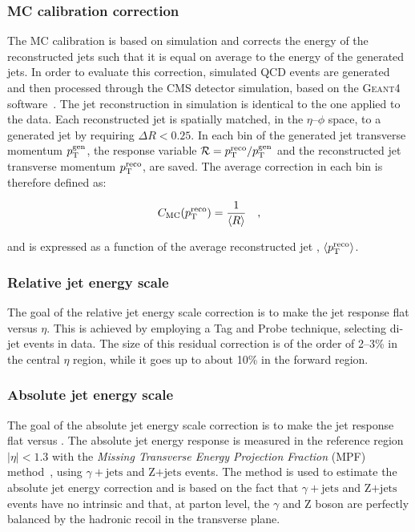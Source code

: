 \subsubsection{MC calibration correction}

The MC calibration is based on simulation and corrects the energy of the reconstructed jets such that it is equal on average to the energy of the generated jets. In order to evaluate this correction, simulated QCD events are generated and then processed through the CMS detector simulation, based on the \textsc{Geant4} software~\cite{Agostinelli:2002hh}. The jet reconstruction in simulation is identical to the one applied to the data. Each reconstructed jet is spatially matched, in the $\eta$--$\phi$ space, to a generated jet by requiring $\Delta R < 0.25$. In each bin of the generated jet transverse momentum $p_\mathrm{T}^\mathrm{gen}$, the response variable $\mathcal{R}=p_\mathrm{T}^\mathrm{reco}/p_\mathrm{T}^\mathrm{gen}$ and the reconstructed jet transverse momentum $p_\mathrm{T}^\mathrm{reco}$, are saved. The average correction in each bin is therefore defined as:

\begin{equation}
C_\mathrm{MC}(p_\mathrm{T}^\mathrm{reco}) = \frac{1}{\langle R \rangle} \quad,
\end{equation}

\noindent and is expressed as a function of the average reconstructed jet \pt, $\langle p_\mathrm{T}^\mathrm{reco} \rangle$.

\subsubsection{Relative jet energy scale}

The goal of the relative jet energy scale correction is to make the jet response flat versus $\eta$. This is achieved by employing a Tag and Probe technique, selecting di-jet events in data. The size of this residual correction is of the order of 2--3\% in the central $\eta$ region, while it goes up to about 10\% in the forward region.

\subsubsection{Absolute jet energy scale}

The goal of the absolute jet energy scale correction is to make the jet response flat versus \pt. The absolute jet energy response is measured in the reference region $|\eta|<1.3$ with the \emph{Missing Transverse Energy Projection Fraction} (MPF) method~\cite{Abbott:1998xw}, using $\gamma+\mathrm{jets}$ and Z$+\mathrm{jets}$ events. The method is used to estimate the absolute jet energy correction and is based on the fact that $\gamma+\mathrm{jets}$ and Z$+\mathrm{jets}$ events have no intrinsic \MET and that, at parton level, the $\gamma$ and Z boson are perfectly balanced by the hadronic recoil in the transverse plane.

